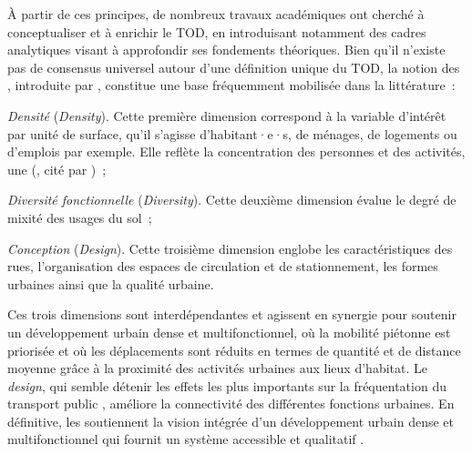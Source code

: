 \begin{refsegment}
À partir de ces principes, de nombreux travaux académiques ont cherché à conceptualiser et à enrichir le \acrshort{TOD}, en introduisant notamment des cadres analytiques visant à approfondir ses fondements théoriques. Bien qu’il n’existe pas de consensus universel autour d’une définition unique du \acrshort{TOD}, la notion des , introduite par \textcolor{blue}{\textcite[216]{cervero_travel_1997}}, constitue une base fréquemment mobilisée dans la littérature~:
    \begin{customitemize}
\item \textsl{Densité} (\textsl{Density}). Cette première dimension correspond à la variable d’intérêt par unité de surface, qu’il s’agisse d’habitant·e·s, de ménages, de logements ou d’emplois par exemple. Elle reflète la concentration des personnes et des activités, une  (\textcolor{blue}{\textcite{cervero_panorama_2012}}, cité par \textcolor{blue}{\textcite[127]{lo_feudo_scenario_2014}})~;
\item \textsl{Diversité fonctionnelle} (\textsl{Diversity}). Cette deuxième dimension évalue le degré de mixité des usages du sol~;
\item \textsl{Conception} (\textsl{Design}). Cette troisième dimension englobe les caractéristiques des rues, l’organisation des espaces de circulation et de stationnement, les formes urbaines ainsi que la qualité urbaine.
    \end{customitemize}%

Ces trois dimensions sont interdépendantes et agissent en synergie pour soutenir un développement urbain dense et multifonctionnel, où la mobilité piétonne est priorisée et où les déplacements sont réduits en termes de quantité et de distance moyenne grâce à la proximité des activités urbaines aux lieux d’habitat. Le \textsl{\gls{design}}, qui semble détenir les effets les plus importants sur la fréquentation du transport public \textcolor{blue}{\autocite[107]{ewing_travel_2001}}, améliore la connectivité des différentes fonctions urbaines. En définitive, les  soutiennent la vision intégrée d'un développement urbain dense et multifonctionnel qui fournit un système accessible et qualitatif \textcolor{blue}{\autocites[216]{cervero_travel_1997}[107]{ewing_travel_2001}}.%


\end{refsegment}
